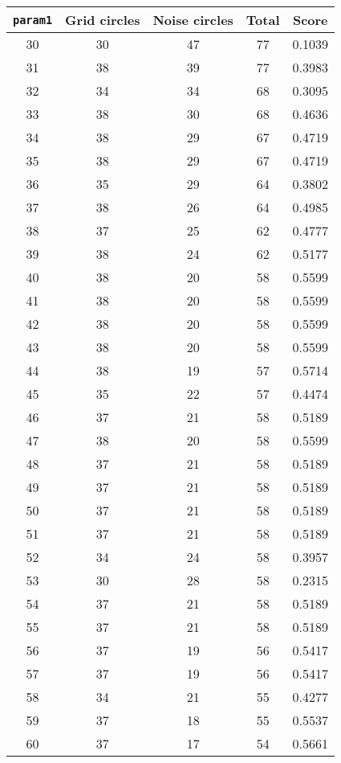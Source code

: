 \documentclass[letterpaper, 12pt]{article}
\begin{document}
\begin{longtable}{|c|c|c|c|c|}
\hline
\textbf{\texttt{param1}} & \textbf{Grid circles} & \textbf{Noise circles} & \textbf{Total} & \textbf{Score} \\
\hline
30 & 30 & 47 & 77 & 0.1039 \\
\hline
31 & 38 & 39 & 77 & 0.3983 \\
\hline
32 & 34 & 34 & 68 & 0.3095 \\
\hline
33 & 38 & 30 & 68 & 0.4636 \\
\hline
34 & 38 & 29 & 67 & 0.4719 \\
\hline
35 & 38 & 29 & 67 & 0.4719 \\
\hline
36 & 35 & 29 & 64 & 0.3802 \\
\hline
37 & 38 & 26 & 64 & 0.4985 \\
\hline
38 & 37 & 25 & 62 & 0.4777 \\
\hline
39 & 38 & 24 & 62 & 0.5177 \\
\hline
40 & 38 & 20 & 58 & 0.5599 \\
\hline
41 & 38 & 20 & 58 & 0.5599 \\
\hline
42 & 38 & 20 & 58 & 0.5599 \\
\hline
43 & 38 & 20 & 58 & 0.5599 \\
\hline
44 & 38 & 19 & 57 & 0.5714 \\
\hline
45 & 35 & 22 & 57 & 0.4474 \\
\hline
46 & 37 & 21 & 58 & 0.5189 \\
\hline
47 & 38 & 20 & 58 & 0.5599 \\
\hline
48 & 37 & 21 & 58 & 0.5189 \\
\hline
49 & 37 & 21 & 58 & 0.5189 \\
\hline
50 & 37 & 21 & 58 & 0.5189 \\
\hline
51 & 37 & 21 & 58 & 0.5189 \\
\hline
52 & 34 & 24 & 58 & 0.3957 \\
\hline
53 & 30 & 28 & 58 & 0.2315 \\
\hline
54 & 37 & 21 & 58 & 0.5189 \\
\hline
55 & 37 & 21 & 58 & 0.5189 \\
\hline
56 & 37 & 19 & 56 & 0.5417 \\
\hline
57 & 37 & 19 & 56 & 0.5417 \\
\hline
58 & 34 & 21 & 55 & 0.4277 \\
\hline
59 & 37 & 18 & 55 & 0.5537 \\
\hline
60 & 37 & 17 & 54 & 0.5661 \\

\end{longtable}
\end{document}
